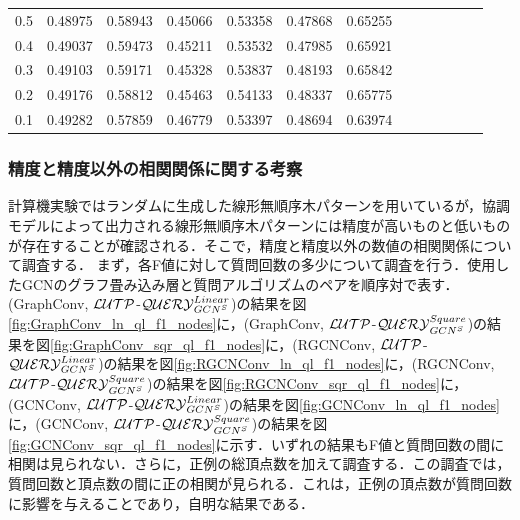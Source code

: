 \begin{table}[tb]
\begin{tabular}{|c|rr|rr|rr|rr|rr|rr|}
  0.5 &   0.48975 &       0.58943 &       0.45066 &       0.53358 &       0.47868 &       0.65255 \\
  0.4 &   0.49037 &       0.59473 &       0.45211 &       0.53532 &       0.47985 &       0.65921 \\
  0.3 &   0.49103 &       0.59171 &       0.45328 &       0.53837 &       0.48193 &       0.65842 \\
  0.2 &   0.49176 &       0.58812 &       0.45463 &       0.54133 &       0.48337 &       0.65775 \\
  0.1 &   0.49282 &       0.57859 &       0.46779 &       0.53397 &       0.48694 &       0.63974 \\ \hline
\end{tabular}
\end{table}

\subsubsection*{精度と精度以外の相関関係に関する考察}
計算機実験ではランダムに生成した線形無順序木パターンを用いているが，協調モデルによって出力される線形無順序木パターンには精度が高いものと低いものが存在することが確認される．そこで，精度と精度以外の数値の相関関係について調査する．
まず，各F値に対して質問回数の多少について調査を行う．使用したGCNのグラフ畳み込み層と質問アルゴリズムのペアを順序対で表す．(GraphConv, ${\cal LUTP}$-${\cal QUERY}_{GCN^S}^{Linear}$)の結果を図\ref{fig:GraphConv_ln_ql_f1_nodes}に，(GraphConv, ${\cal LUTP}$-${\cal QUERY}_{GCN^S}^{Square}$)の結果を図\ref{fig:GraphConv_sqr_ql_f1_nodes}に，(RGCNConv, ${\cal LUTP}$-${\cal QUERY}_{GCN^S}^{Linear}$)の結果を図\ref{fig:RGCNConv_ln_ql_f1_nodes}に，(RGCNConv, ${\cal LUTP}$-${\cal QUERY}_{GCN^S}^{Square}$)の結果を図\ref{fig:RGCNConv_sqr_ql_f1_nodes}に，(GCNConv, ${\cal LUTP}$-${\cal QUERY}_{GCN^S}^{Linear}$)の結果を図\ref{fig:GCNConv_ln_ql_f1_nodes}に，(GCNConv, ${\cal LUTP}$-${\cal QUERY}_{GCN^S}^{Square}$)の結果を図\ref{fig:GCNConv_sqr_ql_f1_nodes}に示す．いずれの結果もF値と質問回数の間に相関は見られない．さらに，正例の総頂点数を加えて調査する．この調査では，質問回数と頂点数の間に正の相関が見られる．これは，正例の頂点数が質問回数に影響を与えることであり，自明な結果である．

